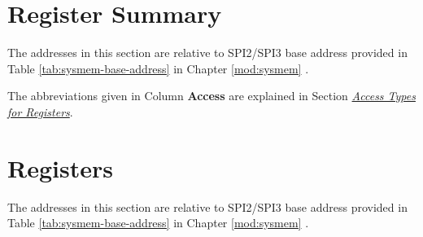 \documentclass[main\_\_EN.tex]{subfiles}
\begin{document}
\hypertarget{spi-reg-summ}{}
\section{Register Summary}
\label{sec:alias-reg-summ}


The addresses in this section are relative to SPI2/SPI3 base address provided in Table \ref{tab:sysmem-base-address} in Chapter \ref{mod:sysmem} \textit{}.

The abbreviations given in Column \textbf{Access} are explained in Section \hyperref[glossary-access-types]{\textit{Access Types for Registers}}.




\section{Registers}\label{Section:SPIREGList}

The addresses in this section are relative to SPI2/SPI3 base address provided in Table \ref{tab:sysmem-base-address} in Chapter \ref{mod:sysmem} \textit{}.


\end{document}
